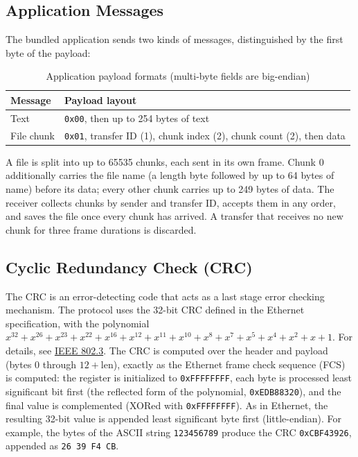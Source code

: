 \documentclass{article}
\begin{document}
\subsection{Application Messages}
The bundled application sends two kinds of messages, distinguished by the first byte of the payload:

\begin{table}[H]
\centering
\begin{tabular}{ll}
\toprule
Message & Payload layout \\
\midrule
Text & \texttt{0x00}, then up to 254 bytes of text \\
File chunk & \texttt{0x01}, transfer ID (1), chunk index (2), chunk count (2), then data \\
\bottomrule
\end{tabular}
\caption{Application payload formats (multi-byte fields are big-endian)}
\label{tab:app-messages}
\end{table}

A file is split into up to 65535 chunks, each sent in its own frame. Chunk 0 additionally carries the file name (a length byte followed by up to 64 bytes of name) before its data; every other chunk carries up to 249 bytes of data. The receiver collects chunks by sender and transfer ID, accepts them in any order, and saves the file once every chunk has arrived. A transfer that receives no new chunk for three frame durations is discarded.

\subsection{Cyclic Redundancy Check (CRC)}
The CRC is an error-detecting code that acts as a last stage error checking mechanism.
The protocol uses the 32-bit CRC defined in the Ethernet specification, with the polynomial $x^{32} + x^{26} + x^{23} + x^{22}
+ x^{16} + x^{12} + x^{11} + x^{10} + x^8 + x^7 + x^5 + x^4 + x^2 + x + 1$. For details, see \href{https://standards.ieee.org/ieee/802.3/7071/}{IEEE 802.3}.
The CRC is computed over the header and payload (bytes $0$ through $12 + \text{len}$), exactly as the Ethernet frame check sequence (FCS) is computed: the register is initialized to \texttt{0xFFFFFFFF}, each byte is processed least significant bit first (the reflected form of the polynomial, \texttt{0xEDB88320}), and the final value is complemented (XORed with \texttt{0xFFFFFFFF}). As in Ethernet, the resulting 32-bit value is appended least significant byte first (little-endian). For example, the bytes of the ASCII string \texttt{123456789} produce the CRC \texttt{0xCBF43926}, appended as \texttt{26 39 F4 CB}.
\end{document}
